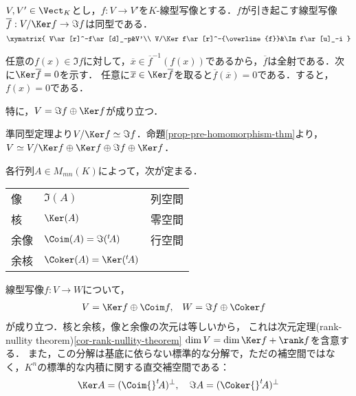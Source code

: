 \documentclass[uplatex, dvipdfmx]{jsreport}
\begin{document}
\begin{proposition}\label{prop-homomorphism-thm}
    $V,V'\in\Vect_K$とし，$f:V\to V'$を$K$-線型写像とする．$f$が引き起こす線型写像$\overline{f}:V/\Ker f\to\Im f$は同型である．
    \[\xymatrix{
        V\ar[r]^-f\ar[d]_-p&V'\\
        V/\Ker f\ar[r]^-{\overline{f}}&\Im f\ar[u]_-i
    }\]
\end{proposition}
\begin{Proof}
    任意の$f(x)\in\Im f$に対して，$\overline{x}\in\overline{f}^{-1}(f(x))$であるから，$\overline{f}$は全射である．次に$\Ker\overline{f}=0$を示す．
    任意に$\overline{x}\in\Ker\overline{f}$を取ると$\overline{f}(\overline{x})=0$である．すると，$f(x)=0$である．
\end{Proof}

\begin{corollary}
    特に，$V=\Im f\oplus\Ker f$が成り立つ．
\end{corollary}
\begin{Proof}
    準同型定理より$V/\Ker f\simeq\Im f$．命題\ref{prop-pre-homomorphism-thm}より，
    $V\simeq V/\Ker f\oplus\Ker f\oplus\Im f\oplus\Ker f$．
\end{Proof}

\begin{remarks}
    各行列$A\in M_{mn}(K)$によって，次が定まる．

    \begin{center}
        \begin{tabular}{l|l|l}
            像&$\Im(A)$&列空間\\
            核&$\Ker(A)$&零空間\\
            余像&$\Coim(A)=\Im({}^t\!A)$&行空間\\
            余核&$\Coker(A)=\Ker({}^t\!A)$&
        \end{tabular}
    \end{center}
    
    線型写像$f:V\to W$について，
    \begin{align*}
        V&=\Ker f\oplus\Coim f,&W&=\Im f\oplus\Coker f
    \end{align*}
    が成り立つ．核と余核，像と余像の次元は等しいから，
    これは次元定理(rank-nullity theorem)\ref{cor-rank-nullity-theorem}
    $\dim V=\dim\Ker f+\rank f$を含意する．
    また，この分解は基底に依らない標準的な分解で，ただの補空間ではなく，$K^n$の標準的な内積に関する直交補空間である：
    \begin{align*}
        \Ker A=(\Coim {}^t\!A)^\bot,\quad\Im A=(\Coker {}^t\!A)^\bot
    \end{align*}
\end{remarks}
\end{document}
